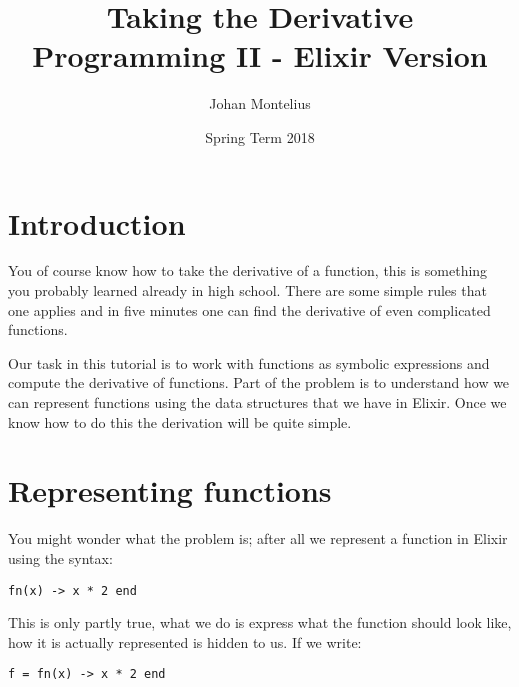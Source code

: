 \documentclass[a4paper,11pt]{article}
\begin{document}

\title{
    \textbf{Taking the Derivative}\\
    \large{Programming II - Elixir Version}
}
\author{Johan Montelius}
\date{Spring Term 2018}
\maketitle
\thispagestyle{fancy}



\section*{Introduction}

You of course know how to take the derivative of a function, this is
something you probably learned already in high school. There are some
simple rules that one applies and in five minutes one can find the
derivative of even complicated functions.

Our task in this tutorial is to work with functions as symbolic
expressions and compute the derivative of functions. Part of the
problem is to understand how we can represent functions using the data
structures that we have in Elixir. Once we know how to do this the
derivation will be quite simple.  



\section{Representing functions}

You might wonder what the problem is; after all we represent a function in Elixir using the syntax:

\begin{verbatim}
fn(x) -> x * 2 end
\end{verbatim}

This is only partly true, what we do is express what the function
should look like, how it is actually represented is hidden to us.
If we write:

\begin{verbatim}
f = fn(x) -> x * 2 end
\end{verbatim}
\end{document}
